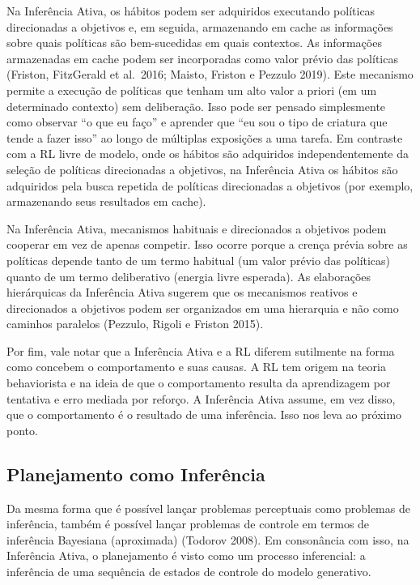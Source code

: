 \documentclass[
  12pt,
]{book}
\begin{document}
Na Inferência Ativa, os hábitos podem ser adquiridos executando políticas direcionadas a objetivos e, em seguida, armazenando em cache as informações sobre quais políticas são bem-sucedidas em quais contextos. As informações armazenadas em cache podem ser incorporadas como valor prévio das políticas (Friston, FitzGerald et al.~2016; Maisto, Friston e Pezzulo 2019). Este mecanismo permite a execução de políticas que tenham um alto valor a priori (em um determinado contexto) sem deliberação. Isso pode ser pensado simplesmente como observar ``o que eu faço'' e aprender que ``eu sou o tipo de criatura que tende a fazer isso'' ao longo de múltiplas exposições a uma tarefa. Em contraste com a RL livre de modelo, onde os hábitos são adquiridos independentemente da seleção de políticas direcionadas a objetivos, na Inferência Ativa os hábitos são adquiridos pela busca repetida de políticas direcionadas a objetivos (por exemplo, armazenando seus resultados em cache).

Na Inferência Ativa, mecanismos habituais e direcionados a objetivos podem cooperar em vez de apenas competir. Isso ocorre porque a crença prévia sobre as políticas depende tanto de um termo habitual (um valor prévio das políticas) quanto de um termo deliberativo (energia livre esperada). As elaborações hierárquicas da Inferência Ativa sugerem que os mecanismos reativos e direcionados a objetivos podem ser organizados em uma hierarquia e não como caminhos paralelos (Pezzulo, Rigoli e Friston 2015).

Por fim, vale notar que a Inferência Ativa e a RL diferem sutilmente na forma como concebem o comportamento e suas causas. A RL tem origem na teoria behaviorista e na ideia de que o comportamento resulta da aprendizagem por tentativa e erro mediada por reforço. A Inferência Ativa assume, em vez disso, que o comportamento é o resultado de uma inferência. Isso nos leva ao próximo ponto.

\hypertarget{planejamento-como-inferuxeancia}{%
\subsection{Planejamento como Inferência}\label{planejamento-como-inferuxeancia}}

Da mesma forma que é possível lançar problemas perceptuais como problemas de inferência, também é possível lançar problemas de controle em termos de inferência Bayesiana (aproximada) (Todorov 2008). Em consonância com isso, na Inferência Ativa, o planejamento é visto como um processo inferencial: a inferência de uma sequência de estados de controle do modelo generativo.
\end{document}
